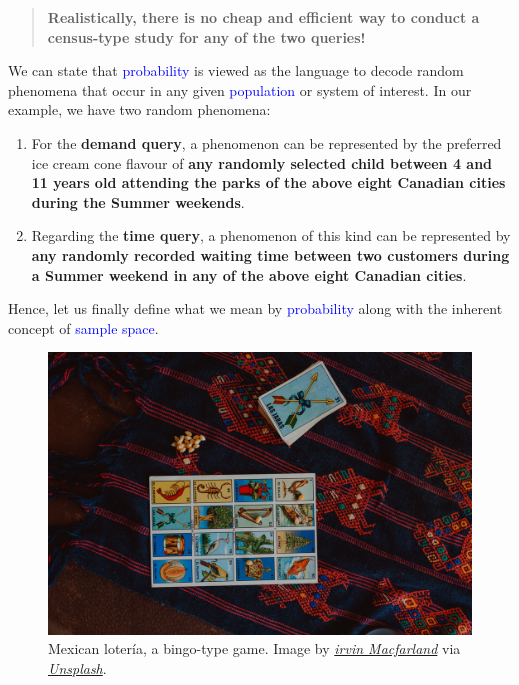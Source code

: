 \documentclass[
  letterpaper,
  DIV=11,
  numbers=noendperiod]{scrreprt}
\providecommand{\tightlist}{%
  \setlength{\itemsep}{0pt}\setlength{\parskip}{0pt}}\usepackage{longtable,booktabs,array}
\begin{document}
\begin{quote}
\textbf{Realistically, there is no cheap and efficient way to conduct a
census-type study for any of the two queries!}
\end{quote}

We can state that \textcolor{blue}{probability} is viewed as the
language to decode random phenomena that occur in any given
\textcolor{blue}{population} or system of interest. In our example, we
have two random phenomena:

\begin{enumerate}
\def\labelenumi{\arabic{enumi}.}
\tightlist
\item
  For the \textbf{demand query}, a phenomenon can be represented by the
  preferred ice cream cone flavour of \textbf{any randomly selected
  child between 4 and 11 years old attending the parks of the above
  eight Canadian cities during the Summer weekends}.
\item
  Regarding the \textbf{time query}, a phenomenon of this kind can be
  represented by \textbf{any randomly recorded waiting time between two
  customers during a Summer weekend in any of the above eight Canadian
  cities}.
\end{enumerate}

Hence, let us finally define what we mean by
\textcolor{blue}{probability} along with the inherent concept of
\textcolor{blue}{sample space}.

\begin{figure}[H]

{\centering \includegraphics[width=5.72917in,height=\textheight]{book/img/loteria.jpg}

}

\caption{Mexican lotería, a bingo-type game. Image by
\href{https://unsplash.com/@irvinmac}{\emph{irvin Macfarland}} via
\href{https://unsplash.com/photos/blue-white-and-red-playing-cards-clelay10tfg}{\emph{Unsplash}}.}

\end{figure}%
\end{document}

